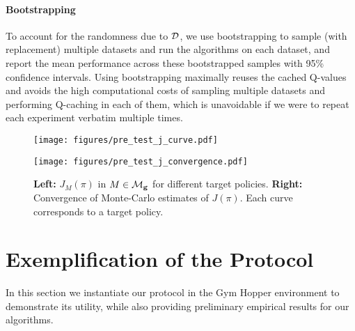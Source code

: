 \paragraph{Bootstrapping} To account for the randomness due to $\mathcal{D}$, we use bootstrapping to sample (with replacement) multiple datasets and run the algorithms on each dataset, and report the mean performance across these bootstrapped samples with 95\% confidence intervals. Using bootstrapping maximally reuses the cached Q-values and avoids the high computational costs of sampling multiple datasets and performing Q-caching in each of them, which is unavoidable if we were to repeat each experiment verbatim multiple times. %
%


\begin{figure}[t]
	\centering
	\begin{minipage}{0.49\linewidth}
		\centering
		\texttt{[image: figures/pre\_test\_j\_curve.pdf]}
	\end{minipage}
	\begin{minipage}{0.49\linewidth}
		\centering
		\texttt{[image: figures/pre\_test\_j\_convergence.pdf]}
	\end{minipage}
    \caption{\textbf{Left:} $J_M(\pi)$ in $M\in\mathcal{M}_{\mathbf{g}}$ for different target policies. \textbf{Right:} Convergence of Monte-Carlo estimates of $J(\pi)$. Each curve corresponds to a target policy. %
    \label{fig:sanity}} \vspace{-.5em}
\end{figure}

\section{Exemplification of the Protocol} \label{sec:exp}

In this section we instantiate our protocol in the Gym Hopper environment to demonstrate its utility, while also providing preliminary empirical results for our algorithms. 

\begin{comment}
    provide empirical results based on the proposed experiment protocol, with the following purposes:
%
%
(1) Demonstrate the experiment protocol and discuss important considerations in setting up the experiments.
(2) Provide preliminary empirical comparisons of the proposed new estimators.
(3) Demonstrate how to design more nuanced experiments to draw further insights.
%

\end{comment}


